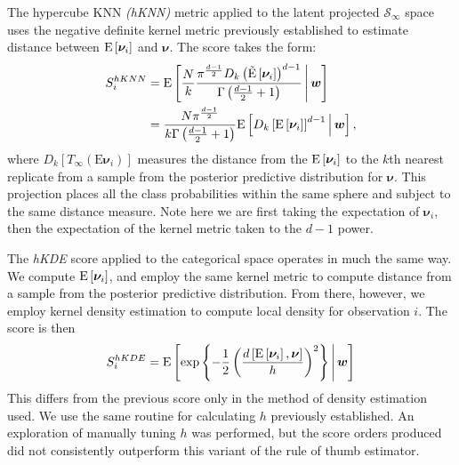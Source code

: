 The hypercube KNN \emph{(hKNN)} metric applied to the latent projected 
    $\mathcal{S}_{\infty}$ space
  uses the negative definite kernel metric previously established to estimate distance
  between $\text{E}\left[\bm{\nu}_i\right]$ and $\bm{\nu}$.  The score takes the form:
\begin{equation}
   \label{score:cat_hknn}
   \begin{aligned}
   S_i^{hKNN} &= \text{E}\left[\frac{N}{k}
        \frac{\pi^{\frac{d-1}{2}}D_{k}\left(\tilde{\text{E}}\left[\bm{\nu}_i\right]\right)^{d-1}}{\Gamma\left(\frac{d-1}{2} + 1\right)}
   \,\middle\vert\,\bm{w}\right]\\
   &= \frac{N\pi^{\frac{d-1}{2}}}{k\Gamma\left(\frac{d-1}{2} + 1\right)}\text{E}\left[D_{k}\left[\text{E}\left[\bm{\nu}_i\right]\right]^{d-1}\,\middle\vert\, \bm{w}\right],
   \end{aligned}
\end{equation}
where $D_{k}\left[T_{\infty}(\text{E}\bm{\nu}_i)\right]$ measures the distance 
  from the  $\text{E}\left[\bm{\nu}_i\right]$ to the $k$th 
  nearest replicate from a sample from the posterior predictive distribution for $\bm{\nu}$.  
  This projection places all the class probabilities within the same sphere and subject to the 
  same distance measure.  Note here we are first taking the expectation of $\bm{\nu}_i$, then 
  the expectation of the kernel metric taken to the $d-1$ power.

The \emph{hKDE} score applied to the categorical space operates in much the same way.  
    We compute $\text{E}\left[\bm{\nu}_i\right]$, and employ the same kernel metric to compute 
    distance from a sample from the posterior predictive distribution.  
    From there, however, we employ kernel density estimation 
    to compute local density for observation $i$.  The score is then
\begin{equation}
    \label{score:cat_hkde}
    S_i^{hKDE} = \text{E}\left[
    \exp\left\lbrace
    -\frac{1}{2}\left(
    \frac{
    d\left[\text{E}\left[\bm{\nu}_i\right], \bm{\nu}\right]}{h}
    \right)^2
    \right\rbrace 
    \,\middle\vert\, \bm{w}\right]
\end{equation}
This differs from the previous score only in the method of density estimation used.  
    We use the same routine for calculating $h$ previously established.  An exploration 
    of manually tuning $h$ was performed, but the score orders produced did not consistently 
    outperform this variant of the rule of thumb estimator.

